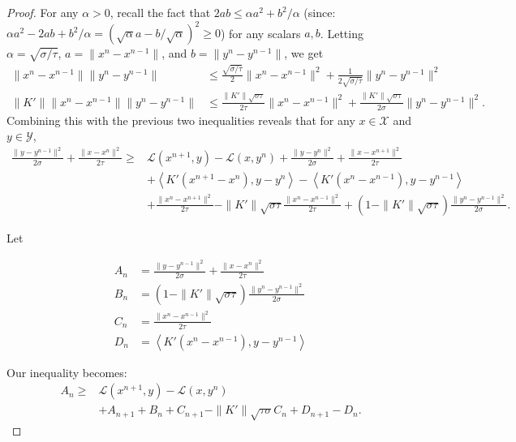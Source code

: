 \documentclass[twoside,12pt,openright]{report}  %
\begin{document}
\begin{proof}
For any $\alpha >0$, recall the fact that $2ab \leq \alpha a^2+b^2/\alpha$ (since: \(\alpha a^2-2ab+b^2/ \alpha = (\sqrt{\alpha}a-b/\sqrt{\alpha})^2 \ge0\)) for any scalars $a,b$. Letting $\alpha=\sqrt{\sigma/\tau}$, $a=\|x^n-x^{n-1}\|$, and $b=\|y^{n}-y^{n-1}\|$, we get
\begin{align*}
    \|x^n-x^{n-1}\|\|y^{n}-y^{n-1}\| &\leq \frac{\sqrt{\sigma/\tau}}{2} \|x^n-x^{n-1}\|^2+\frac{1}{2\sqrt{\sigma/\tau}}\|y^{n}-y^{n-1}\|^2 \\
    \|K'\|\|x^n-x^{n-1}\|\|y^{n}-y^{n-1}\| &\leq \frac{\|K'\|\sqrt{\sigma\tau}}{2\tau}\|x^n-x^{n-1}\|^2+\frac{\|K'\|\sqrt{\sigma\tau}}{2\sigma}\|y^{n}-y^{n-1}\|^2.
\end{align*}
Combining this with the previous two inequalities reveals that for any $x \in \mathcal{X}$ and $y\in \mathcal{Y}$,
\begin{equation}
\label{N term before summation}
\begin{aligned}
    \frac{\|y-y^{n-1}\|^2}{2\sigma}+\frac{\|x-x^n\|^2}{2\tau} \geq& \mathcal{L}(x^{n+1},y)- \mathcal{L}(x,y^n) + \frac{\|y-y^{n}\|^2}{2\sigma}+\frac{\|x-x^{n+1}\|^2}{2\tau}\\
    &+ \left \langle K'(x^{n+1}-x^n), y-y^{n}\right \rangle - \left \langle K'(x^n-x^{n-1}), y-y^{n-1}\right \rangle\\
    &+ \frac{\|x^n-x^{n+1}\|^2}{2\tau}-\|K'\|\sqrt{\sigma\tau}\frac{\|x^n-x^{n-1}\|^2}{2\tau} +(1-\|K'\|\sqrt{\sigma\tau})\frac{\|y^{n}-y^{n-1}\|^2}{2\sigma}.
\end{aligned}
\end{equation}

Let 

\[
\label{An to Dn}
    \begin{aligned}
A_n &= \frac{\|y-y^{n-1}\|^2}{2\sigma} + \frac{\|x-x^n\|^2}{2\tau} \\
B_n &= (1-\|K'\|\sqrt{\sigma\tau}) \frac{\|y^n - y^{n-1}\|^2}{2\sigma} \\
C_n &= \frac{\|x^n - x^{n-1}\|^2}{2\tau} \\
D_n &= \left\langle K'(x^n - x^{n-1}), y - y^{n-1} \right\rangle
\end{aligned}
\]

Our inequality becomes:
\[
\begin{aligned}
    A_n \geq& \mathcal{L}(x^{n+1},y)- \mathcal{L}(x,y^n)\\ &+ A_{n+1} +B_n +C_{n+1}-\|K'\|\sqrt{\tau\sigma}C_n +D_{n+1}-D_n.
\end{aligned}
\]


\end{proof}
\end{document}

